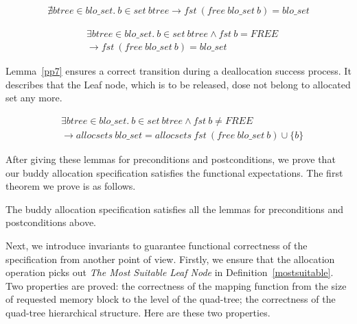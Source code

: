 \begin{lemma} 
\label{pp5}
\end{lemma}
\vspace{-7pt}
{\footnotesize
\begin{align*}
\nexists btree \in blo\_set.\ b \in set\ btree \longrightarrow fst\ (free\ blo\_set\ b) = blo\_set
\end{align*}
}
\vspace{-12pt}
	
\begin{lemma} 
\label{pp6}
\end{lemma}
\vspace{-7pt}
{\footnotesize
\begin{align*}
&\exists btree \in blo\_set.\ b \in set\ btree \wedge fst\ b = FREE \\
&\longrightarrow fst\ (free\ blo\_set\ b) = blo\_set
\end{align*}
}
\vspace{-12pt}

Lemma~\ref{pp7} ensures a correct transition during a deallocation success process. It describes that the Leaf node, which is to be released, dose not belong to allocated set any more.

\begin{lemma} 
\label{pp7}
\end{lemma}
\vspace{-7pt}
{\footnotesize
\begin{align*}
&\exists btree \in blo\_set.\ b \in set\ btree \wedge fst\ b \neq FREE \\ &\longrightarrow allocsets\ blo\_set = allocsets\ fst\ (free\ blo\_set\ b) \cup \lbrace b \rbrace
\end{align*}
}
\vspace{-12pt}

After giving these lemmas for preconditions and postconditions, we prove that our buddy allocation specification satisfies the functional expectations. The first theorem we prove is as follows.

\begin{theorem}
The buddy allocation specification satisfies all the lemmas for preconditions and postconditions above.
\end{theorem}

Next, we introduce invariants to guarantee functional correctness of the specification from another point of view. Firstly, we ensure that the allocation operation picks out \emph{The Most Suitable Leaf Node} in Definition~\ref{mostsuitable}. Two properties are proved: the correctness of the mapping function from the size of requested memory block to the level of the quad-tree; the correctness of the quad-tree hierarchical structure. Here are these two properties.

